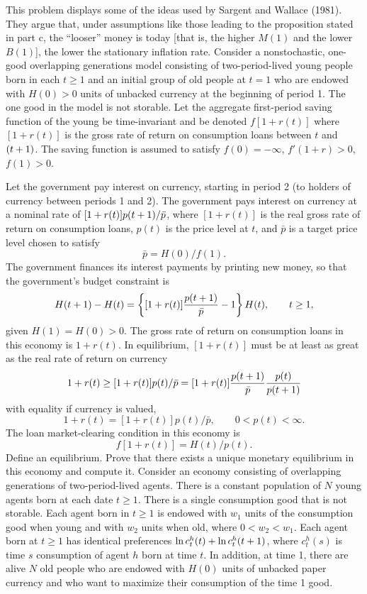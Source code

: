This problem displays some of the ideas used by Sargent and Wallace (1981).
They argue that, under assumptions like those leading to the
proposition stated in part c, the ``looser'' money is today [that is, the
higher $M(1)$ and the lower $B(1)$], the lower the stationary inflation rate.
\medskip
{}
\medskip
\noindent Consider a nonstochastic, one-good overlapping generations model consisting of
two-period-lived young people born in each $t\ge 1$ and  an initial group of
old people at $t=1$ who are endowed with $H(0)>0$ units of unbacked currency at
the beginning of period 1.  The one good in the model is not storable.  Let the
aggregate first-period saving function of the young be time-invariant and be
denoted $f[1+r(t)]$ where $[1+r(t)]$ is the gross rate of return on consumption
loans between $t$ and $({t+1})$.  The saving function is assumed to satisfy
$f(0)=-\infty$, $f'(1+r)>0$, $f(1)>0$.

Let the government pay interest on currency, starting in period 2 (to holders
of currency between periods 1 and 2).  The government pays interest on currency
at a nominal rate of $[1+r(t)] p({t+1})/\bar p$, where $[1+r(t)]$ is the real
gross rate of return on consumption loans, $p(t)$ is the price level at $t$,
and $\bar p$ is a target price level chosen to satisfy
$$\bar p=H(0)/f(1).$$
The government finances its interest payments by printing new money, so that
the government's budget constraint is
$$H({t+1})-H(t) =\left\{ [1+r(t)] {p({t+1})\over \bar p} -1\right\} H(t),\qquad
t\ge 1,$$
given $H(1)=H(0)>0$.  The gross rate of return on consumption loans in this
economy is $1+r(t)$.  In equilibrium, $[1+r(t)]$ must be at least
as great as the real rate of return on currency
$$1+r(t) \geq [1+r(t)] p(t)/\bar p =[1+r(t)] {p({t+1})\over \bar p} {p(t)\over p({t+1})}$$
with equality if currency is valued,
$$1+r(t) = [1+r(t)]p(t)/\bar p,\qquad 0<p(t)<\infty.$$
The loan market-clearing condition in this economy is
$$f[1+r(t)]=H(t)/p(t).$$
\medskip{} Define an equilibrium.
\medskip{}
 Prove that there exists a unique monetary equilibrium in this economy
and compute it.
\medskip
{}
\medskip
\noindent Consider an economy consisting of overlapping generations of two-period-lived
agents.  There is a constant population of $N$ young agents born at each date
$t\ge 1$.  There is a single consumption good that is not storable.  Each agent
born in $t\ge 1$ is endowed with $w_1$ units of the consumption good when young
and with $w_2$ units when old, where $0<w_2<w_1$.  Each agent born at $t\ge 1$
has identical preferences $\ln c_t^h(t) +\ln c_t^h ({t+1})$, where $c_t^h(s)$
is time $s$ consumption of agent $h$ born at time $t$.  In addition, at time 1,
there are alive $N$ old people who are endowed with $H(0)$ units of unbacked
paper currency and who want to maximize their consumption of the time 1 good.

